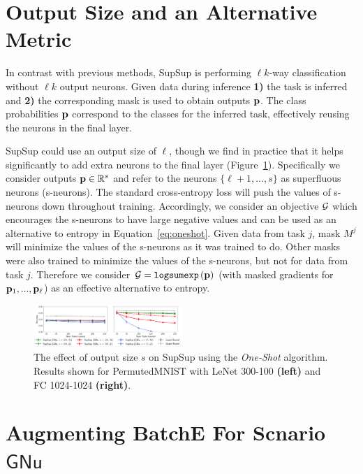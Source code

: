 \documentclass{article}
\newcommand{\ac}{SupSup\xspace}
\newcommand{\casename}[1]{\ensuremath{\mathsf{#1}}\xspace}
\begin{document}
\section{Output Size and an Alternative Metric} \label{sec:s-neuron}
In contrast with previous methods, \ac is performing $\ell k$-way classification without $\ell k$ output neurons. Given data during inference \textbf{1)} the task is inferred and \textbf{2)} the corresponding mask is used to obtain outputs $\mathbf{p}$. The class probabilities $\mathbf{p}$ correspond to the classes for the inferred task, effectively reusing the neurons in the final layer. 

\ac could use an output size of $\ell$, though we find in practice that it helps significantly to add extra neurons to the final layer (Figure~\ref{fig:v1-v2-sz}). Specifically we consider outputs $\mathbf{p} \in \mathbb{R}^{s}$ and refer to the neurons $\{\ell+1,...,s\}$ as superfluous neurons (s-neurons). The standard cross-entropy loss will push the values of s-neurons down throughout training. Accordingly, we consider an objective $\mathcal{G}$ which encourages the s-neurons to have large negative values and can be used as an alternative to entropy in Equation~\ref{eq:oneshot}. Given data from task $j$, mask $M^j$ will minimize the values of the s-neurons as it was trained to do. Other masks were also trained to minimize the values of the s-neurons, but not for data from task $j$. Therefore we consider $ \mathcal{G} = \texttt{logsumexp}\left( \mathbf{p} \right)$ (with masked gradients for $\mathbf{p}_1,...,\mathbf{p}_\ell$) as an effective alternative to entropy.

\begin{figure}[t]
    \centering
    \includegraphics[width=0.5\textwidth]{v1-v2-sz.pdf}
    \caption{The effect of output size $s$ on \ac using the \textit{One-Shot} algorithm. Results shown for PermutedMNIST with LeNet 300-100 \textbf{(left)} and FC 1024-1024 \textbf{(right)}.}
    \label{fig:v1-v2-sz}
    \vspace{-1em}
\end{figure}


\section{Augmenting BatchE For Scnario \casename{GNu}} \label{sec:better-baseline}
\end{document}
